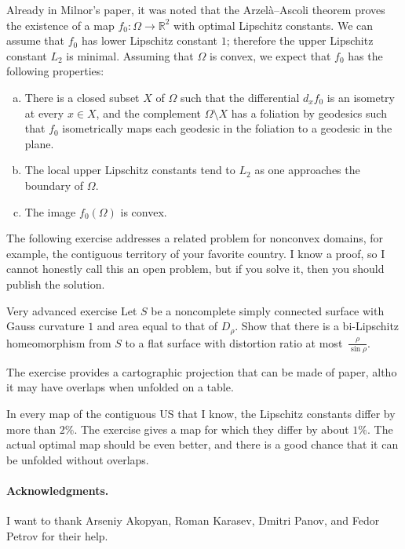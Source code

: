 \documentclass[a4paper,10pt]{article}
\begin{document}
Already in Milnor's paper, it was noted that the Arzelà--Ascoli theorem proves the existence of a map $f_0\colon\Omega\to\mathbb{R}^2$ with optimal Lipschitz constants.
We can assume that $f_0$ has lower Lipschitz constant $1$; therefore the upper Lipschitz constant $L_2$ is minimal.
Assuming that $\Omega$ is convex, we expect that $f_0$ has the following properties:
\begin{enumerate}[(a)]
\item There is a closed subset $X$ of $\Omega$ such that the differential $d_x f_0$ is an isometry at every $x\in X$, and the complement $\Omega\setminus X$ has a foliation by geodesics such that $f_0$ isometrically maps each geodesic in the foliation to a geodesic in the plane.
\item The local upper Lipschitz constants tend to $L_2$ as one approaches the boundary of $\Omega$.
\item The image $f_0(\Omega)$ is convex.
\end{enumerate}

\medskip

The following exercise addresses a related problem for nonconvex domains,
for example, the contiguous territory of your favorite country.
I know a proof, so I cannot honestly call this an open problem,
but if you solve it, then you should publish the solution.

\begin{thm}{Very advanced exercise}
Let $S$ be a noncomplete simply connected surface with Gauss curvature $1$ and area equal to that of $D_\rho$.
Show that there is a bi-Lipschitz homeomorphism from $S$ to a flat surface with distortion ratio at most~$\tfrac{\rho}{\sin\rho}$.
\end{thm}

The exercise provides a cartographic projection that can be made of paper, altho it may have overlaps when unfolded on a table.

In every map of the contiguous US that I know, the Lipschitz constants differ by more than $2\%$.
The exercise gives a map for which they differ by about $1\%$.
The actual optimal map should be even better, and there is a good chance that it can be unfolded without overlaps.

\paragraph{Acknowledgments.}
I want to thank
Arseniy Akopyan,
Roman Karasev,
Dmitri Panov,
and
Fedor Petrov
for their help.

{\sloppy
\def\emph{\textit}
\printbibliography[heading=bibintoc]\fussy}
\end{document}

